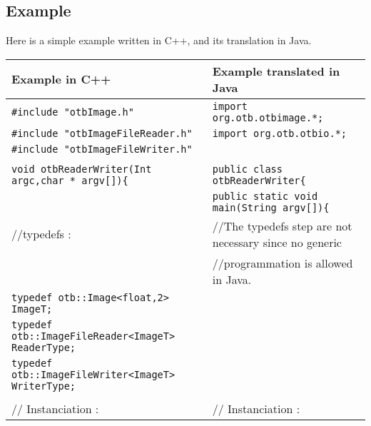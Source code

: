\begin{landscape}
\subsection{Example}

Here is a simple example written in C++, and its translation in Java. 


\begin{table}[!htbp]
\begin{center}
\begin{tabular}{|p{8.35cm}|p{9.75cm}|}
\hline
Example in C++                  &  Example translated in Java  \\
\hline

\verb$#include "otbImage.h"$                &       \verb$import org.otb.otbimage.*;$                                 \\
\verb$#include "otbImageFileReader.h"$      &       \verb$import org.otb.otbio.*;$                                    \\
\verb$#include "otbImageFileWriter.h"$      &                                                                        \\
                                            &                                                                         \\
\verb$void otbReaderWriter(Int argc,char * argv[]){$ & \verb$public class otbReaderWriter{$        \\
                                                     &  \verb$public static void main(String argv[]){$  \\
      
 //typedefs :                              &     //The typedefs step are not necessary since no generic \\
                                           &     //programmation is allowed in Java.    \\

\verb$typedef otb::Image<float,2>  ImageT;$             &           \\
\verb$typedef otb::ImageFileReader<ImageT> ReaderType;$  &           \\
\verb$typedef otb::ImageFileWriter<ImageT> WriterType;$  &            \\

                       &                                           \\
// Instanciation :     &                      // Instanciation :   \\


\end{tabular}
\end{center}
\end{table}
\end{landscape}
